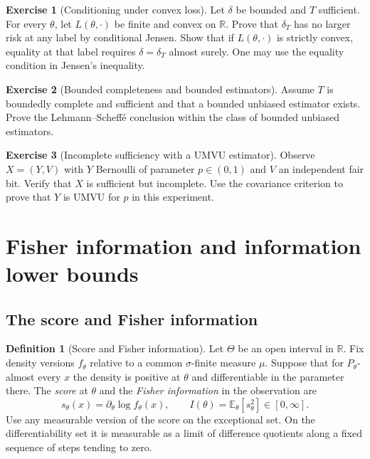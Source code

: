 \documentclass[11pt,oneside]{book}
\theoremstyle{definition}
\newtheorem{definition}[theorem]{Definition}
\newtheorem{exercise}{Exercise}[section]
\theoremstyle{remark}
\newcommand{\R}{\mathbb R}
\begin{document}
\begin{exercise}[Conditioning under convex loss]
\label{exer:rao-blackwell-convex-loss}
Let $\delta$ be bounded and $T$ sufficient. For every $\theta$,
let $L(\theta,\cdot)$ be finite and convex on $\R$. Prove that
$\delta_T$ has no larger risk at any label by conditional Jensen.
Show that if $L(\theta,\cdot)$ is strictly convex, equality at that
label requires $\delta=\delta_T$ almost surely. One may use the
equality condition in Jensen's inequality.
\end{exercise}

\begin{exercise}[Bounded completeness and bounded estimators]
\label{exer:lehmann-scheffe-bounded-class}
Assume $T$ is boundedly complete and sufficient and that a
bounded unbiased estimator exists. Prove the Lehmann--Scheff\'e
conclusion within the class of bounded unbiased estimators.
\end{exercise}

\begin{exercise}[Incomplete sufficiency with a UMVU estimator]
\label{exer:umvu-incomplete-sufficient-example}
Observe $X=(Y,V)$ with $Y$ Bernoulli of parameter $p\in(0,1)$
and $V$ an independent fair bit. Verify that $X$ is sufficient
but incomplete. Use the covariance criterion to prove that
$Y$ is UMVU for $p$ in this experiment.
\end{exercise}



\clearpage
\section{Fisher information and information lower bounds}
\label{sec:fisher-information-cramer-rao}

\subsection{The score and Fisher information}
\label{subsec:fisher-score-information}

\begin{definition}[Score and Fisher information]
\label{def:fisher-score-information}
Let $\Theta$ be an open interval in $\R$. Fix density versions
$f_\theta$ relative to a common $\sigma$-finite measure $\mu$.
Suppose that for $P_\theta$-almost every $x$ the density is positive
at $\theta$ and differentiable in the parameter there. The \emph{score} at $\theta$ and the \emph{Fisher
information} in the observation are
\[
s_\theta(x)=\partial_\theta\log f_\theta(x),
\qquad
I(\theta)=\mathbb E_\theta[s_\theta^2]\in[0,\infty].
\]
Use any measurable version of the score on the exceptional set.
On the differentiability set it is measurable as a limit of
difference quotients along a fixed sequence of steps tending to zero.
\end{definition}
\end{document}
